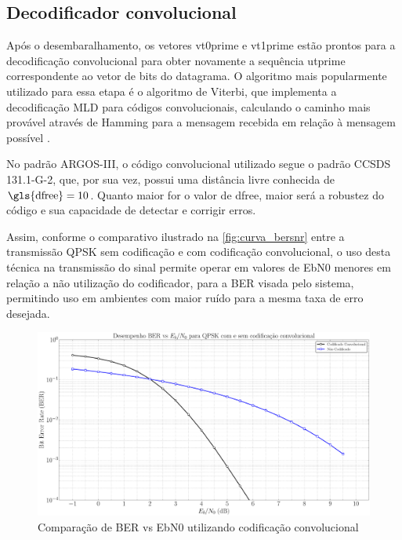\subsection{Decodificador convolucional}

Após o desembaralhamento, os vetores \gls{vt0prime} e \gls{vt1prime} estão prontos para a decodificação convolucional para obter novamente a sequência \gls{utprime} correspondente ao vetor de bits do datagrama. O algoritmo mais popularmente utilizado para essa etapa é o algoritmo de Viterbi, que implementa a decodificação \gls{MLD} para códigos convolucionais, calculando o caminho mais provável através de \gls{Hamming} para a mensagem recebida em relação à mensagem possível \cite{cnes_services_and_message_formats_ed2_rev2_2006, rodrigues_demodulador_2018}.

No padrão \gls{ARGOS-III}, o código convolucional utilizado segue o padrão \gls{CCSDS} 131.1-G-2, que, por sua vez, possui uma distância livre conhecida de $\text{\gls{dfree}} = 10$. Quanto maior for o valor de \gls{dfree}, maior será a robustez do código e sua capacidade de detectar e corrigir erros.

\noindent Assim, conforme o comparativo ilustrado na \autoref{fig:curva_bersnr} entre a transmissão \gls{QPSK} sem codificação e com codificação convolucional, o uso desta técnica na transmissão do sinal permite operar em valores de \gls{EbN0} menores em relação a não utilização do codificador, para a \gls{BER} visada pelo sistema, permitindo uso em ambientes com maior ruído para a mesma taxa de erro desejada.

\begin{figure}[H]
	\centering
	\caption{Comparação de BER vs \gls{EbN0} utilizando codificação convolucional}\label{fig:curva_bersnr}
	\includegraphics[width=\linewidth]{assets/cap2/bersnr.pdf}
\end{figure}